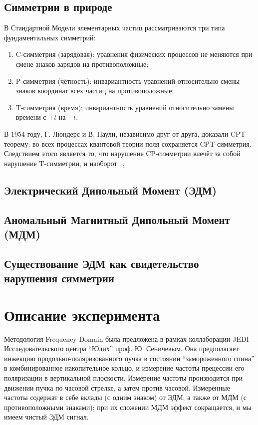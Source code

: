 \documentclass{report}
\begin{document}
\section{Симметрии в природе}
В Стандартной Модели элементарных частиц рассматриваются три типа фундаментальных симметрий:~\cite{Sozzi:Symmetries}
\begin{enumerate}
\item C-симметрия (зарядовая): уравнения физических процессов не меняются при смене знаков зарядов на противоположные;
\item P-симметрия (чётность): инвариантность уравнений относительно смены знаков координат всех частиц на противоположные;
\item T-симметрия (время): инвариантность уравнений относительно замены времени с $+t$ на $-t$.
\end{enumerate}

В 1954 году, Г. Люндерс и В. Паули, независимо друг от друга, доказали CPT-теорему: во всех процессах квантовой теории поля сохраняется CPT-симметрия. Следствием этого является то, что нарушение CP-симметрии влечёт за собой нарушение T-симметрии, и наоборот.~\cite{Lunders:CPT},~\cite{Pauli:CPT}


\section{Электрический Дипольный Момент (ЭДМ)}



\section{Аномальный Магнитный Дипольный Момент (МДМ)}

\section{Существование ЭДМ как свидетельство нарушения симметрии}


\chapter{Описание эксперимента}
Методология Frequency Domain была предложена в рамках коллаборации JEDI Исследовательского центра ``Юлих'' проф. Ю. Сеничевым. Она предполагает инжекцию продольно-поляризованного пучка в состоянии ``замороженного спина'' в комбинированное накопительное кольцо, и измерение частоты прецессии его поляризации в вертикальной плоскости. Измерение частоты производится при движении пучка по часовой стрелке, а затем против часовой. Измеренные частоты содержат в себе вклады (с одним знаком) от ЭДМ, а также от МДМ (с противоположными знаками); при их сложении МДМ эффект сокращается, и мы имеем чистый ЭДМ сигнал. 
\end{document}

